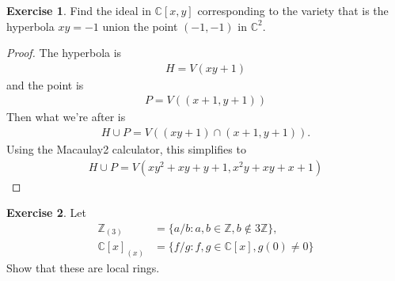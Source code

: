 \documentclass[12pt]{extarticle}
\newcommand{\set}[1]{\{#1\}}
\newcommand{\C}{\mathbb{C}}
\newcommand{\Z}{\mathbb{Z}}
\newcommand{\<}{\langle}
\renewcommand{\>}{\rangle}
\theoremstyle{definition}
\newtheorem{exercise}{Exercise}
\begin{document}
\begin{exercise}
  Find the ideal in $\C[x,y]$ corresponding to the variety that is the hyperbola $xy=-1$ union the point $(-1,-1)$ in $\C^2$.
\end{exercise}
\begin{proof}
  The hyperbola is 
  \begin{align*}
    H = V(xy+1)
  \end{align*}
  and the point is
  \begin{align*}
    P = V((x+1,y+1))
  \end{align*}
  Then what we're after is
  \begin{align*}
    H \cup P = V((xy+1) \cap (x+1,y+1)).
  \end{align*}
  Using the Macaulay2 calculator, this simplifies to
  \begin{align*}
    H \cup P = V(xy^2 + xy + y + 1, x^2y + xy + x + 1)
  \end{align*}
\end{proof}
\begin{exercise}
  Let
  \begin{align*}
    \Z_{(3)} &= \set{a/b: a,b \in \Z, b \not \in 3\Z}, \\
    \C[x]_{(x)} &= \set{f/g: f,g \in \C[x], g(0) \neq 0}
  \end{align*}
  Show that these are local rings.
\end{exercise}
\end{document}
